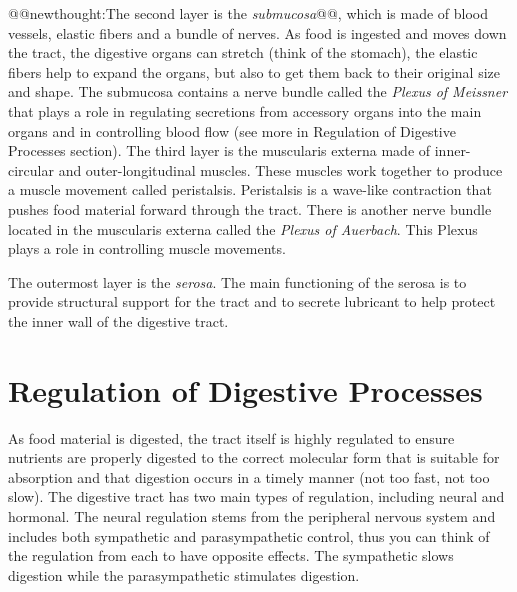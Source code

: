 \documentclass{tufte-handout}
\makeatletter
\def\newthought#1{@@newthought:#1@@}
\makeatother
\begin{document}
\newthought{The second layer is the \emph{submucosa}}, which is made of blood vessels, elastic fibers and a bundle of nerves. As food is ingested and moves down the tract, the digestive organs can stretch (think of the stomach), the elastic fibers help to expand the organs, but also to get them back to their original size and shape. The submucosa contains a nerve bundle called the \emph{Plexus of Meissner} that plays a role in regulating secretions from accessory organs into the main organs and in controlling blood flow (see more in Regulation of Digestive Processes section). The third layer is the muscularis externa made of inner-circular and outer-longitudinal muscles. These muscles work together to produce a muscle movement called peristalsis. Peristalsis is a wave-like contraction that pushes food material forward through the tract. There is another nerve bundle located in the muscularis externa called the \emph{Plexus of Auerbach}. This Plexus plays a role in controlling muscle movements. 

The outermost layer is the \emph{serosa}. The main functioning of the serosa is to provide structural support for the tract and to secrete lubricant to help protect the inner wall of the digestive tract.

\section{Regulation of Digestive Processes}
As food material is digested, the tract itself is highly regulated to ensure nutrients are properly digested to the correct molecular form that is suitable for absorption and that digestion occurs in a timely manner (not too fast, not too slow). The digestive tract has two main types of regulation, including neural and hormonal. The neural regulation stems from the peripheral nervous system and includes both sympathetic and parasympathetic control, thus you can think of the regulation from each to have opposite effects. The sympathetic slows digestion while the parasympathetic stimulates digestion.
\end{document}
